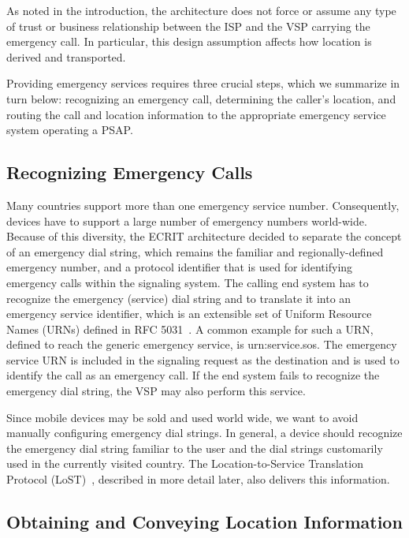 \documentclass[12pt]{article}
\begin{document}
As noted in the introduction, the architecture does not force or assume any type of trust or business relationship between the ISP and the VSP carrying the emergency call. In particular, this design assumption affects how location is derived and transported.

Providing emergency services requires three crucial steps, which we summarize in turn below: recognizing an emergency call, determining the caller's location, and routing the call and location information to the appropriate emergency service system operating a PSAP.

\subsection{Recognizing Emergency Calls}
Many countries support more than one emergency service number. Consequently, devices have to support a large number of emergency numbers world-wide. Because of this diversity, the ECRIT architecture decided to separate the concept of an emergency dial string, which remains the familiar and regionally-defined emergency number, and a protocol identifier that is used for identifying emergency calls within the signaling system.  The calling end system has to recognize the emergency (service) dial string and to translate it into an emergency service identifier, which is an extensible set of Uniform Resource Names (URNs) defined in RFC 5031~\cite{rfc5031}. A common example for such a URN, defined to reach the generic emergency service, is urn:service.sos. The emergency service URN is included in the signaling request as the destination and is used to identify the call as an emergency call. If the end system fails to recognize the emergency dial string, the VSP may also perform this service.

Since mobile devices may be sold and used world wide, we want to avoid manually configuring emergency dial strings. In general, a device should recognize the emergency dial string familiar to the user and the dial strings customarily used in the currently visited country. The Location-to-Service Translation Protocol (LoST)~\cite{rfc5222}, described in more detail later, also delivers this information.

\subsection{Obtaining and Conveying Location Information}
\end{document}
